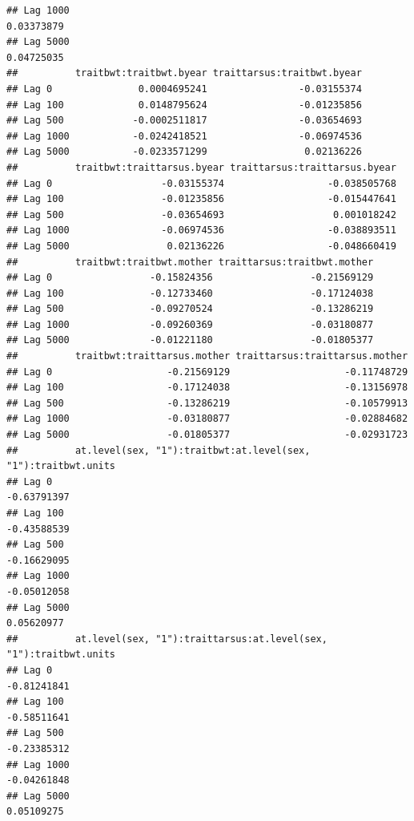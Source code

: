 \documentclass[
  12pt,
]{book}
\begin{document}
\begin{verbatim}
## Lag 1000                                                           0.03373879
## Lag 5000                                                           0.04725035
##          traitbwt:traitbwt.byear traittarsus:traitbwt.byear
## Lag 0               0.0004695241                -0.03155374
## Lag 100             0.0148795624                -0.01235856
## Lag 500            -0.0002511817                -0.03654693
## Lag 1000           -0.0242418521                -0.06974536
## Lag 5000           -0.0233571299                 0.02136226
##          traitbwt:traittarsus.byear traittarsus:traittarsus.byear
## Lag 0                   -0.03155374                  -0.038505768
## Lag 100                 -0.01235856                  -0.015447641
## Lag 500                 -0.03654693                   0.001018242
## Lag 1000                -0.06974536                  -0.038893511
## Lag 5000                 0.02136226                  -0.048660419
##          traitbwt:traitbwt.mother traittarsus:traitbwt.mother
## Lag 0                 -0.15824356                 -0.21569129
## Lag 100               -0.12733460                 -0.17124038
## Lag 500               -0.09270524                 -0.13286219
## Lag 1000              -0.09260369                 -0.03180877
## Lag 5000              -0.01221180                 -0.01805377
##          traitbwt:traittarsus.mother traittarsus:traittarsus.mother
## Lag 0                    -0.21569129                    -0.11748729
## Lag 100                  -0.17124038                    -0.13156978
## Lag 500                  -0.13286219                    -0.10579913
## Lag 1000                 -0.03180877                    -0.02884682
## Lag 5000                 -0.01805377                    -0.02931723
##          at.level(sex, "1"):traitbwt:at.level(sex, "1"):traitbwt.units
## Lag 0                                                      -0.63791397
## Lag 100                                                    -0.43588539
## Lag 500                                                    -0.16629095
## Lag 1000                                                   -0.05012058
## Lag 5000                                                    0.05620977
##          at.level(sex, "1"):traittarsus:at.level(sex, "1"):traitbwt.units
## Lag 0                                                         -0.81241841
## Lag 100                                                       -0.58511641
## Lag 500                                                       -0.23385312
## Lag 1000                                                      -0.04261848
## Lag 5000                                                       0.05109275

\end{verbatim}
\end{document}
